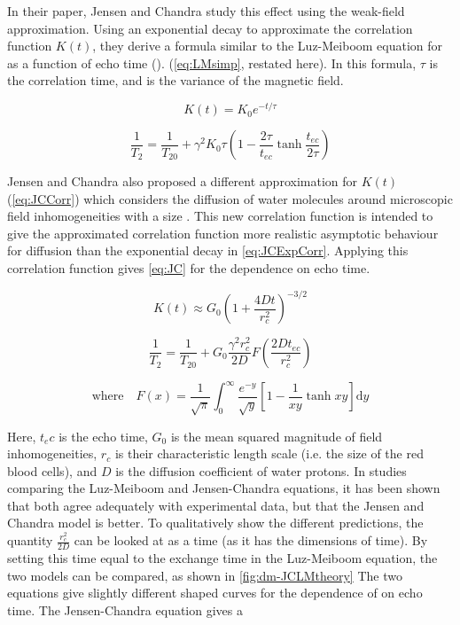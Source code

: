 In their paper\cite{JensenNMRrelaxationtissues2000}, Jensen and Chandra study this effect using the weak-field approximation.
Using an exponential decay to approximate the correlation function $K(t)$, they derive a formula similar to the Luz-Meiboom equation for \Ttwo as a function of echo time (\Tech). (\autoref{eq:LMsimp}, restated here).
In this formula, $\tau$ is the correlation time, and \Kzero is the variance of the magnetic field.

\begin{displaymath}
K(t) = K_0 e^{-t/\tau}
\end{displaymath}

\begin{displaymath}
\frac{1}{T_2} = \frac{1}{T_{20}} + \gamma^2 K_0 \tau (1 - \frac{2\tau}{t_{ec}} \tanh{\frac{t_{ec}}{2\tau}})
\end{displaymath}

Jensen and Chandra also proposed a different approximation for $K(t)$ (\autoref{eq:JCCorr}) which considers the diffusion of water molecules around microscopic field inhomogeneities with a size \rc.
This new correlation function is intended to give the approximated correlation function more realistic asymptotic behaviour for diffusion than the exponential decay in \autoref{eq:JCExpCorr}.
Applying this correlation function gives \autoref{eq:JC} for the \Ttwo dependence on echo time.

\begin{equation}
K(t) \approx G_0 \left(1 + \frac{4Dt}{r_c^2}\right)^{-3/2}
\label{eq:JCCorr}
\end{equation}

\begin{equation}
\label{eq:JC}
\frac{1}{T_2} = \frac{1}{T_{20}}+ G_0 \frac{\gamma^2 r_c^2}{2D} F\left(\frac{2D t_{ec}}{r_c^2}\right)
\end{equation}

\begin{displaymath}
\mathrm{where } \quad F(x) = \frac{1}{\sqrt{\pi}} \int_0^\infty \frac{e^{-y}}{\sqrt{y}} \left[1-\frac{1}{xy} \tanh{xy}\right] \mathrm{d}y
\end{displaymath}

Here, $t_ec$ is the echo time, $G_0$ is the mean squared magnitude of field inhomogeneities, $r_c$ is their characteristic length scale (i.e. the size of the red blood cells), and $D$ is the diffusion coefficient of water protons.
In studies comparing the Luz-Meiboom and Jensen-Chandra equations, it has been shown that both agree adequately with experimental data, but that the Jensen and Chandra model is better.
To qualitatively show the different predictions, the quantity $\frac{r_c^2}{2D}$ can be looked at as a time (as it has the dimensions of time).
By setting this time equal to the exchange time in the Luz-Meiboom equation, the two models can be compared, as shown in \autoref{fig:dm-JCLMtheory}
The two equations give slightly different shaped curves for the dependence of \Ttwo on echo time.
The Jensen-Chandra equation gives a

